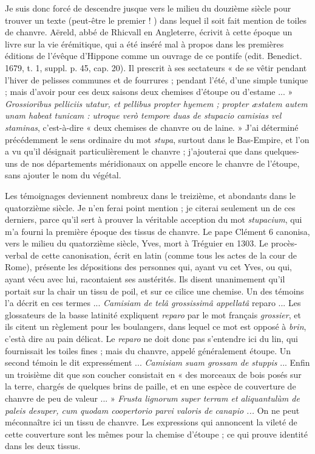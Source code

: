 \documentclass[a4paper, 11pt, oneside, polutonikogreek]{article}
\begin{document}
Je suis donc forcé de descendre jusque vers le milieu du douzième siècle pour trouver un texte (peut-être le premier ! ) dans lequel il soit fait mention de toiles de chanvre. Aëreld, abbé de Rhicvall en Angleterre, écrivit à cette époque un livre sur la vie érémitique, qui a été inséré mal à propos dans les premières éditions de l'évêque d'Hippone comme un ouvrage de ce pontife (edit. Benedict. 1679, t. 1, suppl. p. 45, cap. 20). Il prescrit à ses sectateurs « de se vêtir pendant l'hiver de pelisses communes et de fourrures ; pendant l'été, d'une simple tunique ; mais d'avoir pour ces deux saisons deux chemises d'étoupe ou d'estame ... » \emph{Grossioribus pelliciis utatur, et pellibus propter hyemem ; propter æstatem autem unam habeat tunicam : utroque verò tempore duas de stupacio camisias vel staminas}, c'est-à-dire « deux chemises de chanvre ou de laine. » J'ai déterminé précédemment le sens ordinaire du mot \emph{stupa}, surtout dans le Bas-Empire, et l'on a vu qu'il désignait particulièrement le chanvre ; j'ajouterai que dans quelques-uns de nos départements méridionaux on appelle encore le chanvre de l'étoupe, sans ajouter le nom du végétal.

Les témoignages deviennent nombreux dans le treizième, et abondants dans le quatorzième siècle. Je n'en ferai point mention ; je citerai seulement un de ces derniers, parce qu'il sert à prouver la véritable acception du mot \emph{stupacium}, qui m'a fourni la première époque des tissus de chanvre. Le pape Clément 6 canonisa, vers le milieu du quatorzième siècle, Yves, mort à Tréguier en 1303. Le procès-verbal de cette canonisation, écrit en latin (comme tous les actes de la cour de Rome), présente les dépositions des personnes qui, ayant vu cet Yves, ou qui, ayant vécu avec lui, racontaient ses austérités. Ils disent unanimement qu'il portait sur la chair un tissu de poil, et sur ce cilice une chemise. Un des témoins l'a décrit en ces termes ... \emph{Camisiam de telâ grossissimâ appellatâ} reparo ... Les glossateurs de la basse latinité expliquent \emph{reparo} par le mot français \emph{grossier}, et ils citent un règlement pour les boulangers, dans lequel ce mot est opposé à \emph{brin}, c'està dire au pain délicat. Le \emph{reparo} ne doit donc pas s'entendre ici du lin, qui fournissait les toiles fines ; mais du chanvre, appelé généralement étoupe. Un second témoin le dit expressément ... \emph{Camisiam suam grossam de stuppis} ... Enfin un troisième dit que son coucher consistait en « des morceaux de bois posés sur la terre, chargés de quelques brins de paille, et en une espèce de couverture de chanvre de peu de valeur ... » \emph{Frusta lignorum super terram et aliquantulùm de paleis desuper, cum quodam coopertorio parvi valoris de canapio ...} On ne peut méconnaître ici un tissu de chanvre. Les expressions qui annoncent la vileté de cette couverture sont les mêmes pour la chemise d'étoupe ; ce qui prouve identité dans les deux tissus.
\end{document}

